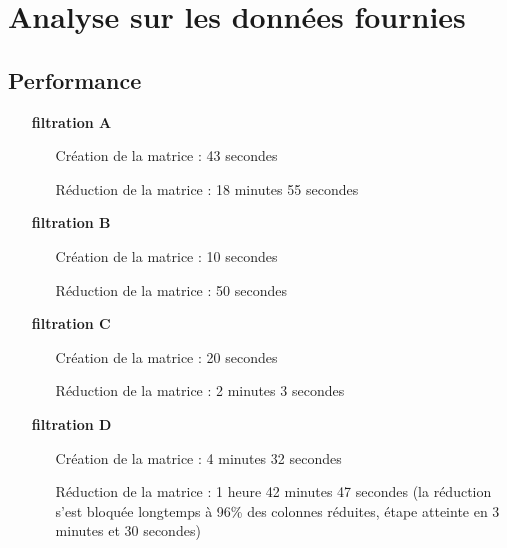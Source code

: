\documentclass[french, a4paper, 12pt]{article}
\begin{document}
\pagebreak


\section{Analyse sur les données fournies}

\subsection{Performance}

\begin{itemize}
    \item[\textbf{filtration A}] \hspace{1cm}
        \begin{itemize}
            \item[Création de la matrice :] 43 secondes %
            \item[Réduction de la matrice :] 18 minutes 55 secondes 
        \end{itemize}
    \item[\textbf{filtration B}] \hspace{1cm}
        \begin{itemize}
            \item[Création de la matrice :] 10 secondes %
            \item[Réduction de la matrice :] 50 secondes 
        \end{itemize}
    \item[\textbf{filtration C}] \hspace{1cm}
        \begin{itemize}
            \item[Création de la matrice :] 20 secondes %
            \item[Réduction de la matrice :] 2 minutes 3 secondes 
        \end{itemize}
    \item[\textbf{filtration D}] \hspace{1cm}
        \begin{itemize}
            \item[Création de la matrice :] 4 minutes 32 secondes
            \item[Réduction de la matrice :] 1 heure 42 minutes 47 secondes
            (la réduction s'est bloquée longtemps à 96\% des colonnes
            réduites, étape atteinte en 3 minutes et 30 secondes)  
        \end{itemize}
\end{itemize}
\end{document}
